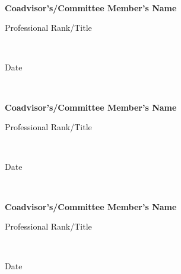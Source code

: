 \hspace{4.5cm} \hrulefill\

\vspace{-0.5cm}

\hspace{4.5cm}
\textbf{Coadvisor's/Committee Member's Name}

\vspace{-.5cm}

\hspace{4.5cm} Professional Rank/Title

\vspace{-0.25cm}

\hspace{4.5cm} \hrulefill\

\vspace{-0.5cm}

\hspace{4.5cm}
Date

\hspace{4.5cm} \hrulefill\

\vspace{-0.5cm}

\hspace{4.5cm}
\textbf{Coadvisor's/Committee Member's Name}

\vspace{-.5cm}

\hspace{4.5cm} Professional Rank/Title

\vspace{-0.25cm}

\hspace{4.5cm} \hrulefill\

\vspace{-0.5cm}

\hspace{4.5cm}
Date

\hspace{4.5cm} \hrulefill\

\vspace{-0.5cm}

\hspace{4.5cm}
\textbf{Coadvisor's/Committee Member's Name}

\vspace{-.5cm}

\hspace{4.5cm} Professional Rank/Title

\vspace{-0.25cm}

\hspace{4.5cm} \hrulefill\

\vspace{-0.5cm}

\hspace{4.5cm}
Date